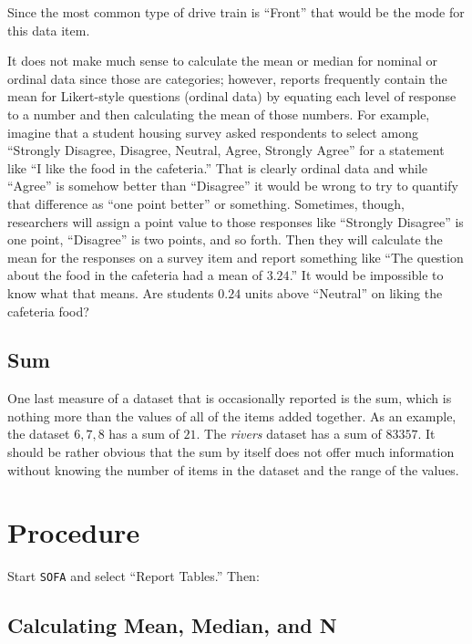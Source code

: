 Since the most common type of drive train is ``Front'' that would be the mode for this data item.

It does not make much sense to calculate the mean or median for nominal or ordinal data since those are categories; however, reports frequently contain the mean for Likert-style questions (ordinal data) by equating each level of response to a number and then calculating the mean of those numbers. For example, imagine that a student housing survey asked respondents to select among ``Strongly Disagree, Disagree, Neutral, Agree, Strongly Agree'' for a statement like ``I like the food in the cafeteria.'' That is clearly ordinal data and while ``Agree'' is somehow better than ``Disagree'' it would be wrong to try to quantify that difference as ``one point better'' or something. Sometimes, though, researchers will assign a point value to those responses like ``Strongly Disagree'' is one point, ``Disagree'' is two points, and so forth. Then they will calculate the mean for the responses on a survey item and report something like ``The question about the food in the cafeteria had a mean of $ 3.24 $.'' It would be impossible to know what that means. Are students $ 0.24 $ units above ``Neutral'' on liking the cafeteria food?

\subsection{Sum}

One last measure of a dataset that is occasionally reported is the sum, which is nothing more than the values of all of the items added together. As an example, the dataset $ 6, 7, 8 $ has a sum of $ 21 $. The \textit{rivers} dataset has a sum of $ 83357 $. It should be rather obvious that the sum by itself does not offer much information without knowing the number of items in the dataset and the range of the values.

\section{Procedure}

Start \texttt{SOFA} and select ``Report Tables.'' Then:

\subsection{Calculating Mean, Median, and N}

